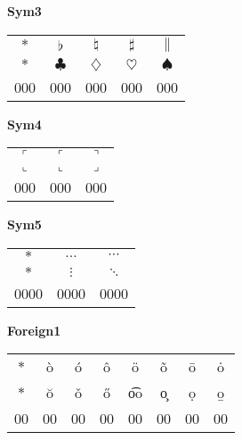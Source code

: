 \documentclass[12pt]{report}
\newlength{\mine}
\newlength{\niz}
\def\pmb{}
\begin{document}
\textbf{Sym3}
\par\nobreak\vspace{2mm}
\begin{tabular}{|c|cccc|}
  \hline
   $\pmb *           $&
   $\pmb\flat        $&
   $\pmb\natural     $&
   $\pmb\sharp       $&
   $\pmb\|           $\\[\mine]
   $\pmb *           $&
   $\pmb\clubsuit    $&
   $\pmb\diamondsuit $&
   $\pmb\heartsuit   $&
   $\pmb\spadesuit   $\\[\niz]
  \hline\hline
  000&000&000&000&000\\
  \hline
\end{tabular}
\goodbreak\par\vspace{3mm}

\textbf{Sym4}
\par\nobreak\vspace{2mm}
\begin{tabular}{|c|cc|}
  \hline
   $\pmb\ulcorner $&
   $\pmb\ulcorner $&
   $\pmb\urcorner $\\[\mine]
   $\pmb\llcorner $&
   $\pmb\llcorner $&
   $\pmb\lrcorner $\\[\niz]
  \hline\hline
  000&000&000\\
  \hline
\end{tabular}
\goodbreak\par\vspace{3mm}

\textbf{Sym5}
\par\nobreak\vspace{2mm}
\begin{tabular}{|c|cc|}
  \hline
   $\pmb *       $&
   $\pmb\ldots   $&
   $\pmb\cdots   $\\[\mine]
   $\pmb *       $&
   $\pmb\vdots   $&
   $\pmb\ddots   $\\[\niz]
  \hline\hline
  0000&0000&0000\\
  \hline
\end{tabular}
\goodbreak\par\vspace{3mm}

\newpage

\textbf{Foreign1}
\par\nobreak\vspace{2mm}
\begin{tabular}{|c|ccccccc|}
  \hline
   $\pmb *$&
   \`{o} &
   \'{o} &
   \^{o} &
   \"{o} &
   \~{o} &
   \={o} &
   \.{o} \\[\mine]
   $\pmb *$&
   \u{o} &
   \v{o} &
   \H{o} &
   \t{oo}&
   \c{o} &
   \d{o} &
   \b{o} \\[\niz]
  \hline\hline
  00&00&00&00&00&00&00&00\\
  \hline
\end{tabular}
\goodbreak\par\vspace{3mm}
\end{document}
